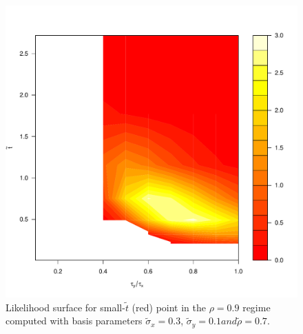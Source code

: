 \documentclass[10pt]{article}
\begin{document}
\begin{enumerate}
\begin{figure}
  \centering
  \includegraphics[scale=0.3]{small-sigma-Galerkin-no-filter-rho-09.pdf}
  \caption{Likelihood surface for small-$\tilde{t}$ (red) point in the
    $\rho = 0.9$ regime computed with basis parameters
    $\tilde{\sigma}_x = 0.3$,
    $\tilde{\sigma}_y = 0.1 and \tilde{\rho}=0.7$.}
  \label{fig:rho-09}
\end{figure}





\end{enumerate}
\end{document}
